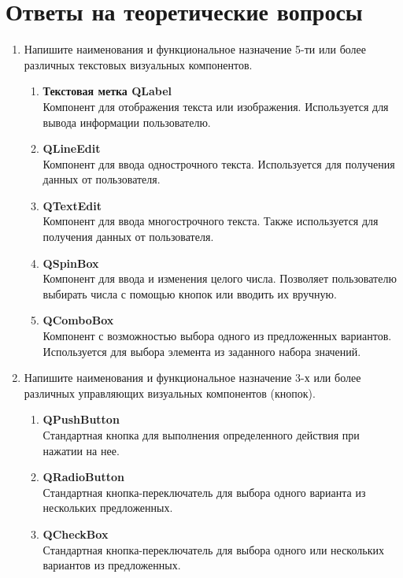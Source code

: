 \documentclass[a4paper,14pt]{extreport} %
\begin{document}
	\section*{Ответы на теоретические вопросы}
	\begin{enumerate}
		\item Напишите наименования и функциональное назначение 5-ти или
		более различных текстовых визуальных компонентов.
		\begin{enumerate}
			\item  \textbf{Текстовая метка QLabel}\\
			Компонент для отображения текста или изображения. Используется для вывода информации пользователю.
			
			\item \textbf{QLineEdit}\\
			Компонент для ввода однострочного текста. Используется для получения данных от пользователя.
			
			\item \textbf{QTextEdit}\\
			Компонент для ввода многострочного текста. Также используется для получения данных от пользователя.
			
			\item \textbf{QSpinBox}\\
			Компонент для ввода	и изменения целого числа. Позволяет пользователю выбирать числа с помощью кнопок или вводить их вручную.
			
			\item \textbf{QComboBox}\\
			Компонент с возможностью выбора одного из предложенных вариантов. Используется для выбора элемента из заданного набора значений.
		\end{enumerate}
		\item Напишите наименования и функциональное назначение 3-х или
		более различных управляющих визуальных компонентов (кнопок).
		\begin{enumerate}
			\item \textbf{QPushButton}\\
			Стандартная кнопка для выполнения определенного действия при нажатии на нее.
			\item \textbf{QRadioButton}\\
			Стандартная кнопка-переключатель для выбора одного варианта из нескольких предложенных.
			\item \textbf{QCheckBox}\\
			Стандартная кнопка-переключатель для выбора одного или нескольких вариантов из предложенных.
		\end{enumerate}
		

\end{enumerate}
\end{document}
